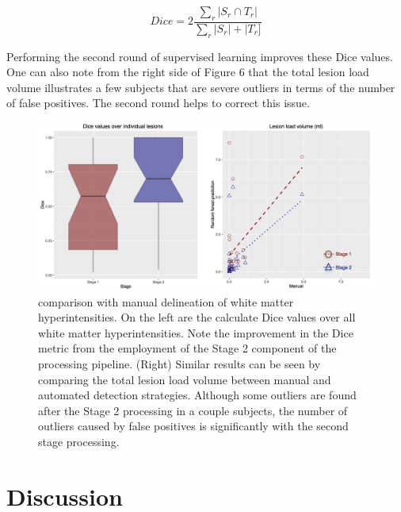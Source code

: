 \documentclass[11pt,]{article}
\begin{document}
\[ Dice = 2 \frac{\sum_r|S_r \cap T_r|}{\sum_r|S_r| + |T_r] } \]

Performing the second round of supervised learning improves these Dice
values. One can also note from the right side of Figure 6 that the total
lesion load volume illustrates a few subjects that are severe outliers
in terms of the number of false positives. The second round helps to
correct this issue.

\begin{figure}[htbp]
\centering
\includegraphics{Figures/llvAndDice.png}
\caption{ comparison with manual delineation of
white matter hyperintensities. On the left are the
calculate Dice values over all white matter
hyperintensities. Note the improvement in the Dice metric from the
employment of the Stage 2 component of the processing pipeline. (Right)
Similar results can be seen by comparing the total lesion load volume
between manual and automated detection strategies. Although some
outliers are found after the Stage 2 processing in a couple subjects,
the number of outliers caused by false positives is
 significantly with the second stage
processing.}
\end{figure}

\section{Discussion}\label{discussion}

\section{}\label{section}
\end{document}
